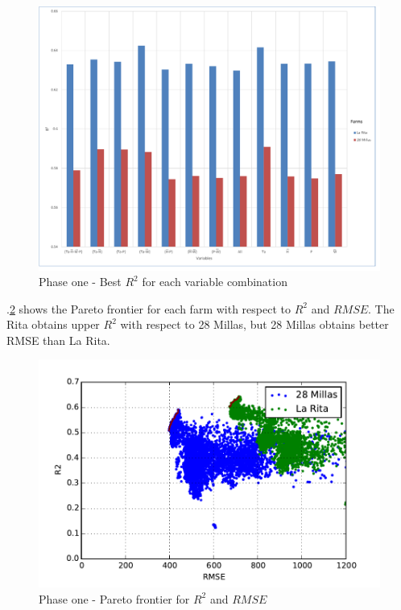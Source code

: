 \documentclass[review]{elsarticle}
\begin{document}
\begin{figure}[H] 
 \centering
 \includegraphics[scale=.5]{Phase_one_Best_R2_for_variables}
 \caption{Phase one - Best $R^2$ for each variable combination} 
 \label{figura6} 
\end{figure}

\figurename $.$\ref{figura7} shows the Pareto frontier for each farm with respect to $R^2$ and $RMSE$. The Rita obtains upper $R^2$ with respect to 28 Millas, but 28 Millas obtains better RMSE than La Rita. 

\begin{figure}[H] 
 \centering
 \includegraphics[scale=.8]{Phase_one_R2_RMSE}
 \caption{Phase one - Pareto frontier for $R^2$ and $RMSE$} 
 \label{figura7} 
\end{figure}
\end{document}
